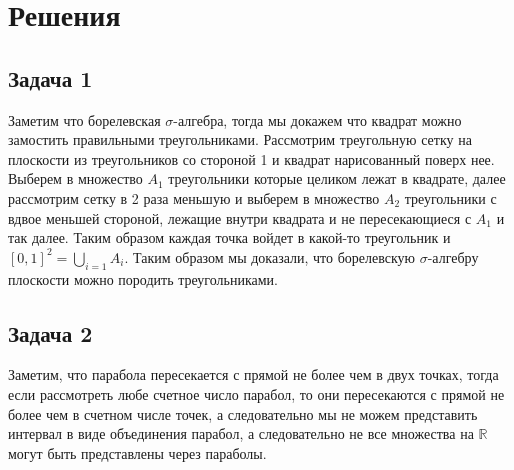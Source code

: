 
\newpage
\section*{Решения}
\subsection*{Задача 1}
	Заметим что борелевская $\sigma$-алгебра, тогда мы докажем что квадрат можно замостить правильными треугольниками. Рассмотрим треугольную сетку на плоскости из треугольников со стороной 1 и квадрат нарисованный поверх нее. Выберем в множество $A_1$ треугольники которые целиком лежат в квадрате, далее рассмотрим сетку в 2 раза меньшую и выберем в множество $A_2$ треугольники с вдвое меньшей стороной, лежащие внутри квадрата и не пересекающиеся с $A_1$ и так далее. Таким образом каждая точка войдет в какой-то треугольник и $[0,1]^2 = \bigcup\limits_{i=1} A_i$. Таким образом мы доказали, что борелевскую $\sigma$-алгебру плоскости можно породить треугольниками.


\subsection*{Задача 2}
	Заметим, что парабола пересекается с прямой не более чем в двух точках, тогда если рассмотреть любе счетное число парабол, то они пересекаются с прямой не более чем в счетном числе точек, а следовательно мы не можем представить интервал в виде объединения парабол, а следовательно не все множества на $\mathbb{R}$ могут быть представлены через параболы.


